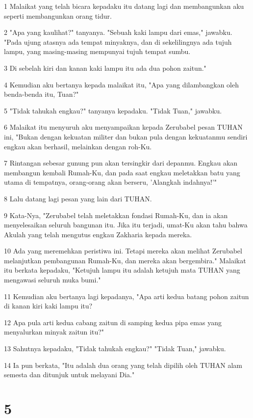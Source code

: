 \par 1 Malaikat yang telah bicara kepadaku itu datang lagi dan membangunkan aku seperti membangunkan orang tidur.
\par 2 "Apa yang kaulihat?" tanyanya. "Sebuah kaki lampu dari emas," jawabku. "Pada ujung atasnya ada tempat minyaknya, dan di sekelilingnya ada tujuh lampu, yang masing-masing mempunyai tujuh tempat sumbu.
\par 3 Di sebelah kiri dan kanan kaki lampu itu ada dua pohon zaitun."
\par 4 Kemudian aku bertanya kepada malaikat itu, "Apa yang dilambangkan oleh benda-benda itu, Tuan?"
\par 5 "Tidak tahukah engkau?" tanyanya kepadaku. "Tidak Tuan," jawabku.
\par 6 Malaikat itu menyuruh aku menyampaikan kepada Zerubabel pesan TUHAN ini, "Bukan dengan kekuatan militer dan bukan pula dengan kekuatanmu sendiri engkau akan berhasil, melainkan dengan roh-Ku.
\par 7 Rintangan sebesar gunung pun akan tersingkir dari depanmu. Engkau akan membangun kembali Rumah-Ku, dan pada saat engkau meletakkan batu yang utama di tempatnya, orang-orang akan berseru, 'Alangkah indahnya!'"
\par 8 Lalu datang lagi pesan yang lain dari TUHAN.
\par 9 Kata-Nya, "Zerubabel telah meletakkan fondasi Rumah-Ku, dan ia akan menyelesaikan seluruh bangunan itu. Jika itu terjadi, umat-Ku akan tahu bahwa Akulah yang telah mengutus engkau Zakharia kepada mereka.
\par 10 Ada yang meremehkan peristiwa ini. Tetapi mereka akan melihat Zerubabel melanjutkan pembangunan Rumah-Ku, dan mereka akan bergembira." Malaikat itu berkata kepadaku, "Ketujuh lampu itu adalah ketujuh mata TUHAN yang mengawasi seluruh muka bumi."
\par 11 Kemudian aku bertanya lagi kepadanya, "Apa arti kedua batang pohon zaitun di kanan kiri kaki lampu itu?
\par 12 Apa pula arti kedua cabang zaitun di samping kedua pipa emas yang menyalurkan minyak zaitun itu?"
\par 13 Sahutnya kepadaku, "Tidak tahukah engkau?" "Tidak Tuan," jawabku.
\par 14 Ia pun berkata, "Itu adalah dua orang yang telah dipilih oleh TUHAN alam semesta dan ditunjuk untuk melayani Dia."

\chapter{5}

